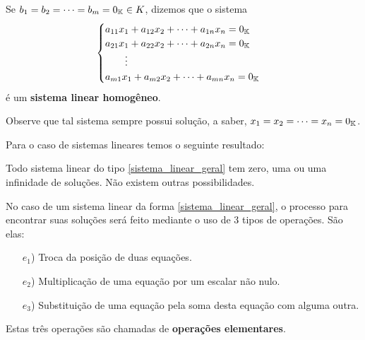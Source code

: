 Se $b_1 = b_2 = \cdots = b_m = 0_{\mathbb{K}} \in K$,  dizemos que o sistema
\begin{equation}\label{sistemalinearhomogeneo}\index{Sistema Linear}
    \begin{cases}
        a_{11}x_1 + a_{12}x_2 + \cdots + a_{1n}x_n = 0_\cp{K}\\
        a_{21}x_1 + a_{22}x_2 + \cdots + a_{2n}x_n = 0_\cp{K}\\
        \qquad \vdots\\
        a_{m1}x_1 + a_{m2}x_2 + \cdots + a_{mn}x_n = 0_\cp{K}
    \end{cases}
\end{equation}
\'e um \textbf{sistema linear homog\^eneo}. 

Observe que tal sistema sempre possui solu\c{c}\~ao,  a saber, $x_1 = x_2 = \cdots = x_n = 0_{\mathbb{K}}$.

Para o caso de sistemas lineares temos o seguinte resultado:

\begin{teorema}
    Todo sistema linear do tipo \eqref{sistema_linear_geral} tem zero,  uma  ou uma infinidade de solu\c{c}\~oes.  N\~ao existem outras possibilidades.
\end{teorema}

No caso de um sistema linear da forma \eqref{sistema_linear_geral},  o processo para encontrar suas solu\c{c}\~oes ser\'a feito mediante o uso de 3 tipos de opera\c{c}\~oes.  S\~ao elas:
\begin{itemize}
\item[$e_1$)] Troca da posi\c{c}\~ao de duas equa\c{c}\~oes.
\item[$e_2$)] Multiplica\c{c}\~ao de uma equa\c{c}\~ao por um escalar n\~ao nulo.
\item[$e_3$)] Substitui\c{c}\~ao de uma equa\c{c}\~ao pela soma desta equa\c{c}\~ao com alguma outra.
\end{itemize}

Estas tr\^es opera\c{c}\~oes s\~ao chamadas de  \textbf{opera\c{c}\~oes elementares}.


